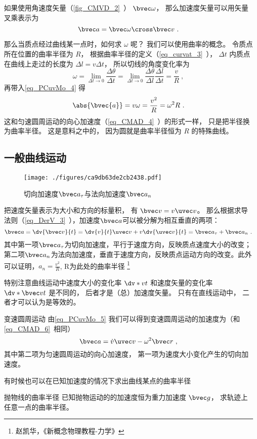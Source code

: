 如果使用角速度矢量（\autoref{fig_CMVD_2}~） $\bvec \omega$， 那么加速度矢量可以用矢量叉乘表示为
\begin{equation}
\bvec a = \bvec \omega \cross \bvec v~.
\end{equation}

那么当质点经过曲线某一点时，如何求 $\omega$ 呢？ 我们可以使用曲率的概念。 令质点所在位置的曲率半径为 $R$， 根据曲率半径的定义（\autoref{eq_curvat_3}~）， $\Delta t$ 内质点在曲线上走过的长度为 $\Delta l = v \Delta t$， 所以切线的角度变化率为
\begin{equation}
\omega = \lim_{\Delta t\to 0}\frac{\Delta \theta}{\Delta t} = \lim_{\Delta t\to 0}\frac{\Delta \theta}{\Delta l} \frac{\Delta l}{\Delta t} = \frac{v}{R}~,
\end{equation}
再带入\autoref{eq_PCuvMo_4} 得
\begin{equation}\label{eq_PCuvMo_3}
\abs{\bvec{a}} = v\omega = \frac{v^2}{R} = \omega^2 R~.
\end{equation}
这和匀速圆周运动的向心加速度（\autoref{eq_CMAD_4}~）的形式一样， 只是把半径换为曲率半径。 这是意料之中的， 因为圆就是曲率半径恒为 $R$ 的特殊曲线。

\subsection{一般曲线运动}
\begin{figure}[ht]
\centering
\texttt{[image: ./figures/ca9db63de2cb2438.pdf]}
\caption{切向加速度$\bvec a_\tau$与法向加速度$\bvec a_n$} \label{fig_PCuvMo_2}
\end{figure}
把速度矢量表示为大小和方向的标量积， 有 $\bvec v = v\uvec v$。 那么根据求导法则（\autoref{eq_DerV_3}~），加速度$\bvec a$可以被分解为相互垂直的两项：
\begin{equation}\label{eq_PCuvMo_5}
\bvec a = \dv{\bvec v}{t} = \dv{v}{t}\uvec v + v\dv{\uvec v}{t} = \bvec a_{\tau}+\bvec a_n~.
\end{equation}
其中第一项$\bvec a_{\tau}$为切向加速度，平行于速度方向，反映质点速度大小的改变；第二项$\bvec a_n$为法向加速度，垂直于速度方向，反映质点运动方向的改变。此外可以证明，$a_n=\frac{v^2}{R}$, R为此处的曲率半径 \footnote{赵凯华，《新概念物理教程-力学》}

特别注意曲线运动中速度大小的变化率 $\dv*{v}{t}$ 和速度矢量的变化率 $\dv*{\bvec v}{t}$ 是不同的， 后者才是（总）加速度矢量。 只有在直线运动中， 二者才可以认为是等效的。

\begin{example}{变速圆周运动}\label{ex_PCuvMo_1}
由\autoref{eq_PCuvMo_5} 我们可以得到变速圆周运动的加速度为（和\autoref{eq_CMAD_6}~相同）
\begin{equation}
\bvec a = \dot v \uvec v - \omega ^2 \bvec r~,
\end{equation}
其中第二项为匀速圆周运动的向心加速度， 第一项为速度大小变化产生的切向加速度。
\end{example}

有时候也可以在已知加速度的情况下求出曲线某点的曲率半径
\begin{exercise}{抛物线的曲率半径}
已知抛物运动的的加速度恒为重力加速度 $\bvec g$， 求轨迹上任意一点的曲率半径。
\end{exercise}
